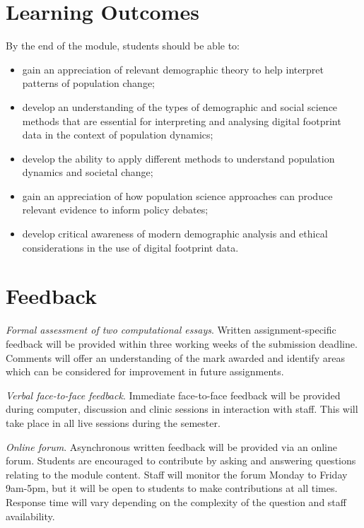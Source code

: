 \documentclass[
  letterpaper,
  DIV=11,
  numbers=noendperiod]{scrreprt}
\begin{document}
\hypertarget{learning-outcomes}{%
\section{Learning Outcomes}\label{learning-outcomes}}

By the end of the module, students should be able to:

\begin{itemize}
\item
  gain an appreciation of relevant demographic theory to help interpret
  patterns of population change;
\item
  develop an understanding of the types of demographic and social
  science methods that are essential for interpreting and analysing
  digital footprint data in the context of population dynamics;
\item
  develop the ability to apply different methods to understand
  population dynamics and societal change;
\item
  gain an appreciation of how population science approaches can produce
  relevant evidence to inform policy debates;
\item
  develop critical awareness of modern demographic analysis and ethical
  considerations in the use of digital footprint data.
\end{itemize}

\hypertarget{feedback}{%
\section{Feedback}\label{feedback}}

\emph{Formal assessment of two computational essays}. Written
assignment-specific feedback will be provided within three working weeks
of the submission deadline. Comments will offer an understanding of the
mark awarded and identify areas which can be considered for improvement
in future assignments.

\emph{Verbal face-to-face feedback}. Immediate face-to-face feedback
will be provided during computer, discussion and clinic sessions in
interaction with staff. This will take place in all live sessions during
the semester.

\emph{Online forum}. Asynchronous written feedback will be provided via
an online forum. Students are encouraged to contribute by asking and
answering questions relating to the module content. Staff will monitor
the forum Monday to Friday 9am-5pm, but it will be open to students to
make contributions at all times. Response time will vary depending on
the complexity of the question and staff availability.
\end{document}
